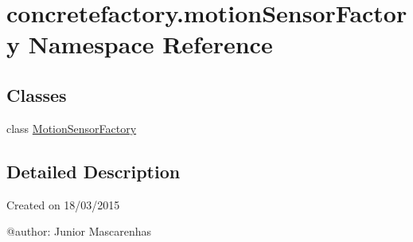 \hypertarget{namespaceconcretefactory_1_1motionSensorFactory}{}\section{concretefactory.\+motion\+Sensor\+Factory Namespace Reference}
\label{namespaceconcretefactory_1_1motionSensorFactory}
\subsection*{Classes}
\begin{DoxyCompactItemize}
\item 
class \hyperlink{classconcretefactory_1_1motionSensorFactory_1_1MotionSensorFactory}{Motion\+Sensor\+Factory}
\end{DoxyCompactItemize}


\subsection{Detailed Description}
\begin{DoxyVerb}Created on 18/03/2015

@author: Junior Mascarenhas
\end{DoxyVerb}
 